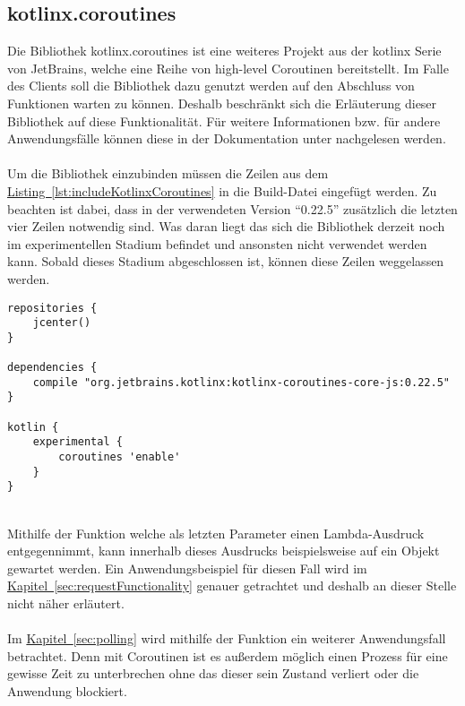 \subsection{kotlinx.coroutines}\label{sec:kotlinxCoroutines}
Die Bibliothek kotlinx.coroutines \cite{kotlinxCoroutines} ist eine weiteres Projekt aus der kotlinx Serie von JetBrains, welche eine Reihe von high-level Coroutinen bereitstellt. Im Falle des Clients soll die Bibliothek dazu genutzt werden auf den Abschluss von Funktionen warten zu können. Deshalb beschränkt sich die Erläuterung dieser Bibliothek auf diese Funktionalität. Für weitere Informationen bzw. für andere Anwendungsfälle können diese in der Dokumentation unter \cite{kotlinxCoroutinesDocu} nachgelesen werden.\\
\\
Um die Bibliothek einzubinden müssen die Zeilen aus dem \hyperref[lst:includeKotlinxCoroutines]{Listing~\ref{lst:includeKotlinxCoroutines}} in die Build-Datei eingefügt werden. Zu beachten ist dabei, dass in der verwendeten Version \enquote{0.22.5} zusätzlich die letzten vier Zeilen notwendig sind. Was daran liegt das sich die Bibliothek derzeit noch im experimentellen Stadium befindet und ansonsten nicht verwendet werden kann. Sobald dieses Stadium abgeschlossen ist, können diese Zeilen weggelassen werden.
\\
\begin{lstlisting}[style=lstStyleFramed, language=Gradle, caption={Einbindung der Bibliothek kotlinx.coroutines mithilfe von Gradle}, label=lst:includeKotlinxCoroutines, float]
repositories {
	jcenter()
}

dependencies {
	compile "org.jetbrains.kotlinx:kotlinx-coroutines-core-js:0.22.5"
}

kotlin {
	experimental {
		coroutines 'enable'
	}
}
\end{lstlisting}
\\
Mithilfe der Funktion  welche als letzten Parameter einen Lambda-Ausdruck entgegennimmt, kann innerhalb dieses Ausdrucks beispielsweise auf ein  Objekt gewartet werden. Ein Anwendungsbeispiel für diesen Fall wird im \hyperref[sec:requestFunctionality]{Kapitel~\ref{sec:requestFunctionality}} genauer getrachtet und deshalb an dieser Stelle nicht näher erläutert.\\
\\
Im \hyperref[sec:polling]{Kapitel~\ref{sec:polling}} wird mithilfe der Funktion  ein weiterer Anwendungsfall betrachtet. Denn mit Coroutinen ist es außerdem möglich einen Prozess für eine gewisse Zeit zu unterbrechen ohne das dieser sein Zustand verliert oder die Anwendung blockiert.

